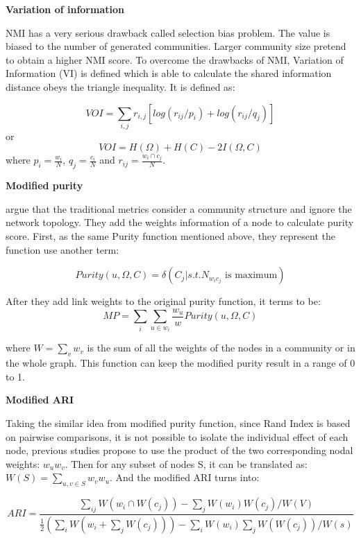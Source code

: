 \textbf{Variation of information}

NMI has a very serious drawback called selection bias problem. The value is biased to the number of generated communities. Larger community size pretend to obtain a higher NMI score. To overcome the drawbacks of NMI, Variation of Information (VI) \cite{meilua2007comparing,kraskov2005hierarchical} is defined which is able to calculate the shared information distance obeys the triangle inequality. It is defined as:

$$ VOI = \sum_{i,j} r_{i,j}[log(r_{ij}/p_{i}) + log(r_{ij}/q_{j})] $$ 
or
$$VOI =  H(\Omega) + H(C)-2I(\Omega,C)$$
where $p_{i} = \frac{w_{i}}{N}$, $q_{j} = \frac{c_{i}}{N}$ and $r_{ij} = \frac{w_{i} \cap c_{j}}{N}$. 


\textbf{Modified purity}

\cite{orman2012comparative,labatut2015generalised} argue that the traditional metrics consider a community structure and ignore the network topology. They add the weights information of a node to calculate purity score. First, as the same Purity function mentioned above, they represent the function use another term:

$$
Purity(u,\Omega,C) = \delta(C_{j}|s.t. N_{w_{i}c_{j}} \text{ is maximum})
$$

After they add link weights to the original purity function, it terms to be:
$$
MP = \sum_{i}\sum_{u \in w_{i}} \frac{w_{u}}{w}Purity(u,\Omega,C) 
$$

where $W=\sum_{v}w_{v}$ is the sum of all the weights of the nodes in a community or in the whole graph. This function can keep the modified purity result in a range of 0 to 1.

\textbf{Modified ARI}

Taking the similar idea from modified purity function, since Rand Index is based on pairwise comparisons, it is not possible to
isolate the individual effect of each node, previous studies propose to use the product of the two
corresponding nodal weights: $w_{u}w_{v}$. Then for any subset of nodes S, it can be translated
as: $W(S) = \sum_{u,v \in S} w_{v}w_{u}$. And the modified ARI turns into:

$$ARI = \frac{\sum_{ij}W(w_{i} \cap W(c_{j})) - \sum_{j}W(w_{i})W(c_{j})/W(V)}{\frac{1}{2}(\sum_{i}W(w_{i}+\sum_{j}W(c_{j}))) - \sum_{i}W(w_{i})\sum_{j}W(W(c_{j}))/W(s)}$$
